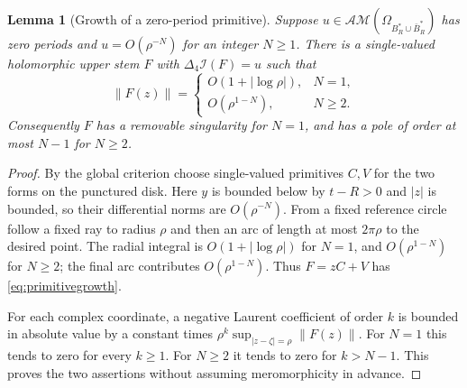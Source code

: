 \documentclass[11pt,a4paper]{article}
\numberwithin{equation}{section}
\newtheorem{lemma}[theorem]{Lemma}
\theoremstyle{definition}
\theoremstyle{remark}
\newcommand{\AM}{\mathcal{AM}}
\newcommand{\lap}{\Delta_4}
\newcommand{\cI}{\mathcal I}
\begin{document}
\begin{lemma}[Growth of a zero-period primitive]
\label{lem:primitivegrowth}
Suppose $u\in\AM(\Omega_{B_R^*\cup\bar B_R^*})$ has zero periods and
$u=O(\rho^{-N})$ for an integer $N\geq1$. There is a single-valued
holomorphic upper stem $F$ with $\lap\cI(F)=u$ such that
\begin{equation}
 \|F(z)\|=
 \begin{cases}
 O(1+|\log\rho|),&N=1,\\
 O(\rho^{1-N}),&N\geq2.
 \end{cases}
 \label{eq:primitivegrowth}
\end{equation}
Consequently $F$ has a removable singularity for $N=1$, and has a pole
of order at most $N-1$ for $N\geq2$.
\end{lemma}
\begin{proof}
By the global criterion choose single-valued primitives $C,V$ for the
two forms on the punctured disk. Here $y$ is bounded below by $t-R>0$
and $|z|$ is bounded, so their differential norms are $O(\rho^{-N})$.
From a fixed reference circle follow a fixed ray to radius $\rho$ and
then an arc of length at most $2\pi\rho$ to the desired point. The
radial integral is $O(1+|\log\rho|)$ for $N=1$, and
$O(\rho^{1-N})$ for $N\geq2$; the final arc contributes
$O(\rho^{1-N})$. Thus $F=zC+V$ has \eqref{eq:primitivegrowth}.

For each complex coordinate, a negative Laurent coefficient of order
$k$ is bounded in absolute value by a constant times
$\rho^k\sup_{|z-\zeta|=\rho}\|F(z)\|$. For $N=1$ this tends to zero
for every $k\geq1$. For $N\geq2$ it tends to zero for $k>N-1$.
This proves the two assertions without assuming meromorphicity in advance.
\end{proof}
\end{document}
